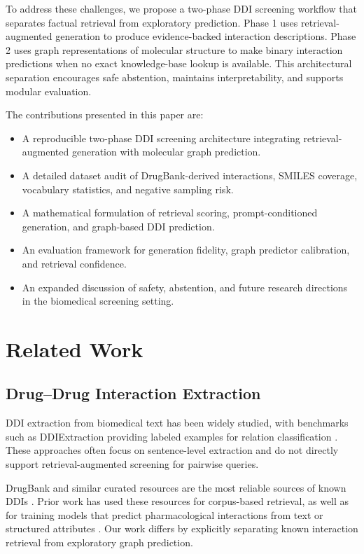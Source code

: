 \documentclass[conference]{IEEEtran}
\begin{document}
To address these challenges, we propose a two-phase DDI screening workflow that separates factual retrieval from exploratory prediction. Phase 1 uses retrieval-augmented generation to produce evidence-backed interaction descriptions. Phase 2 uses graph representations of molecular structure to make binary interaction predictions when no exact knowledge-base lookup is available. This architectural separation encourages safe abstention, maintains interpretability, and supports modular evaluation.

The contributions presented in this paper are:
\begin{itemize}
    \item A reproducible two-phase DDI screening architecture integrating retrieval-augmented generation with molecular graph prediction.
    \item A detailed dataset audit of DrugBank-derived interactions, SMILES coverage, vocabulary statistics, and negative sampling risk.
    \item A mathematical formulation of retrieval scoring, prompt-conditioned generation, and graph-based DDI prediction.
    \item An evaluation framework for generation fidelity, graph predictor calibration, and retrieval confidence.
    \item An expanded discussion of safety, abstention, and future research directions in the biomedical screening setting.
\end{itemize}

\section{Related Work}
\subsection{Drug--Drug Interaction Extraction}
DDI extraction from biomedical text has been widely studied, with benchmarks such as DDIExtraction providing labeled examples for relation classification \cite{segura2013ddi, rinaldi2013ddi}. These approaches often focus on sentence-level extraction and do not directly support retrieval-augmented screening for pairwise queries.

DrugBank and similar curated resources are the most reliable sources of known DDIs \cite{wishart2018drugbank}. Prior work has used these resources for corpus-based retrieval, as well as for training models that predict pharmacological interactions from text or structured attributes \cite{li2017enhancing, wu2021survey}. Our work differs by explicitly separating known interaction retrieval from exploratory graph prediction.
\end{document}
